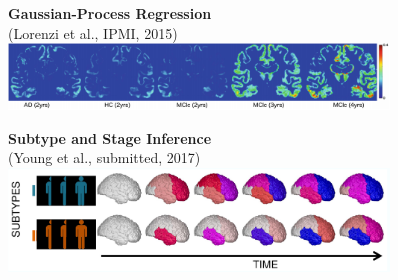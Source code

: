 \documentclass[8pt,xcolor=table]{beamer}
\begin{document}
\begin{frame}
\begin{small}
\begin{figure}[h]
  \vspace{2em}
  \begin{minipage}[t][\mnpHeight][t]{0.49\linewidth}
    \centering
    \textbf{Gaussian-Process Regression}\\ \footnotesize{(Lorenzi et al., IPMI, 2015)}
    \includegraphics[width=0.9\textwidth,trim=0 0 0 0, clip]{../lorenzi_ipmi2015}
    
    \vspace{2em}
    
  \end{minipage}
  \begin{minipage}[t][\mnpHeight][t]{0.49\linewidth}
    \centering
    \textbf{Subtype and Stage Inference}\\ \footnotesize{(Young et al., submitted, 2017)}
    \includegraphics[width=0.9\textwidth]{../sustain}
  \end{minipage}


  \end{figure}
  \end{small}
  
  \vspace{-2em}
  


\end{frame}
\end{document}
